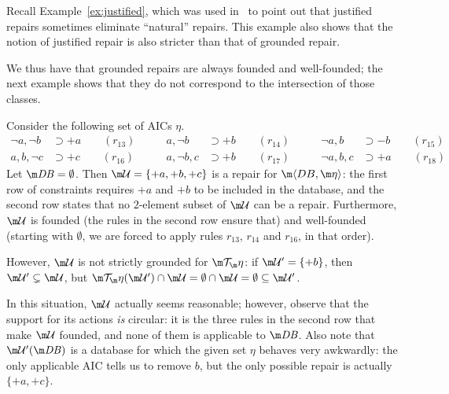 Recall Example~\ref{ex:justified}, which was used in~\cite{CEGN13} to point out that justified repairs sometimes eliminate ``natural'' repairs.
This example also shows that the notion of justified repair is also stricter than that of grounded repair.

We thus have that grounded repairs are always founded and well-founded; the next example shows that they do not correspond to the intersection of those classes.

\begin{example}
  Consider the following set of AICs $\eta$.
  \begin{align*}
    \neg a,\neg b&\supset{+a} \qquad (r_{13}) \qquad &
    a,\neg b&\supset{+b} \qquad (r_{14}) \qquad &
    \neg a,b&\supset{-b} \qquad (r_{15}) \\
    a,b,\neg c&\supset{+c} \qquad (r_{16}) \qquad &
    a,\neg b,c&\supset{+b} \qquad (r_{17}) \qquad &
    \neg a,b,c&\supset{+a}\qquad (r_{18})
  \end{align*}
  Let $\db=\emptyset$.
  Then $\UU=\{{+a},{+b},{+c}\}$ is a repair for $\fulldb$: the first row of constraints requires ${+a}$ and ${+b}$ to be included in the database, and the second row states that no $2$-element subset of $\UU$ can be a repair.
  Furthermore, $\UU$ is founded (the rules in the second row ensure that) and well-founded (starting with $\emptyset$, we are forced to apply rules $r_{13}$, $r_{14}$ and $r_{16}$, in that order).

  However, $\UU$ is not strictly grounded for $\Op$: if $\UU'=\{{+b}\}$, then $\UU'\subsetneq\UU$, but $\Op(\UU')\cap\UU=\emptyset\cap\UU=\emptyset\subseteq\UU'$.
\end{example}
In this situation, $\UU$ actually seems reasonable; however, observe that the support for its actions \emph{is} circular: it is the three rules in the second row that make $\UU$ founded, and none of them is applicable to $\db$.
Also note that $\UU'(\db)$ is a database for which the given set $\eta$ behaves very awkwardly: the only applicable AIC tells us to remove $b$, but the only possible repair is actually $\{{+a},{+c}\}$.

